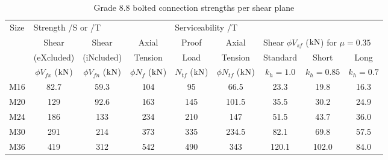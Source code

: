 \begin{table}[H]
\centering\footnotesize
\caption{Grade 8.8 bolted connection strengths per shear plane}\label{tab:bolt8.8}
\begin{tabular}{c|ccc|cc|ccc}
	\toprule
	Size & \multicolumn{3}{l|}{Strength /S or /T}                                                 & \multicolumn{5}{l}{Serviceability /T}                                                                                      \\ \cline{2-9}
	     &            Shear            &            Shear            &           Axial            &         Proof         &            Axial            & \multicolumn{3}{l}{Shear $\phi{}V_{sf}$ ($\si{\kilo\newton}$) for $\mu=0.35$} \\
	     &         (eXcluded)          &         (iNcluded)          &          Tension           &         Load          &           Tension           & Standard &   Short   &                     Long                      \\
	     & $\phi{}V_{fx}$ ($\si{\kilo\newton}$) & $\phi{}V_{fn}$ ($\si{\kilo\newton}$) & $\phi{}N_{f}$ ($\si{\kilo\newton}$) & $N_{tf}$ ($\si{\kilo\newton}$) & $\phi{}N_{tf}$ ($\si{\kilo\newton}$) & $k_h=1.0$  & $k_h=0.85$ &                   $k_h=0.7$                    \\ \midrule
	M16  &            82.7             &            59.3             &            104             &          95           &            66.5             &   23.3   &   19.8    &                     16.3                      \\
	M20  &             129             &            92.6             &            163             &          145          &            101.5            &   35.5   &   30.2    &                     24.9                      \\
	M24  &             186             &             133             &            234             &          210          &             147             &   51.5   &   43.7    &                     36.0                      \\
	M30  &             291             &             214             &            373             &          335          &            234.5            &   82.1   &   69.8    &                     57.5                      \\
	M36  &             419             &             312             &            542             &          490          &             343             &  120.1   &   102.0   &                     84.0                      \\ \bottomrule
\end{tabular}
\end{table}

